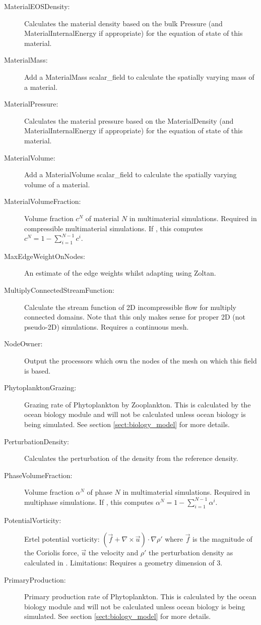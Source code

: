 \begin{description}
\item[MaterialEOSDensity:]Calculates the material density based on the bulk Pressure (and MaterialInternalEnergy if appropriate) for the equation of state of this material.
\item[MaterialMass:]Add a MaterialMass scalar\_field to calculate the spatially varying mass of a material. 
\item[MaterialPressure:] Calculates the material pressure based on the MaterialDensity (and MaterialInternalEnergy if appropriate) for the equation of state of this material.
\item[MaterialVolume:]Add a MaterialVolume scalar\_field to calculate the spatially varying volume of a material.
\item[MaterialVolumeFraction:]Volume fraction $c^N$ of material $N$ in multimaterial simulations. Required in compressible multimaterial simulations. If , this computes $c^N = 1 - \sum_{i=1}^{N-1}c^i$.
\item[MaxEdgeWeightOnNodes:]An estimate of the edge weights whilst adapting using Zoltan.
\item[MultiplyConnectedStreamFunction:]Calculate the stream function of 2D incompressible flow for multiply connected domains. Note that this only makes sense for proper 2D (not pseudo-2D) simulations. Requires a continuous mesh.
\item[NodeOwner:]Output the processors which own the nodes of the mesh on which this field is based.   
\item[PhytoplanktonGrazing:]Grazing rate of Phytoplankton by Zooplankton. This is calculated by the ocean biology module and will not be calculated unless ocean biology is being simulated. See section \ref{sect:biology_model} for more details.
\item[PerturbationDensity:]Calculates the perturbation of the density from the reference density.
\item[PhaseVolumeFraction:]Volume fraction $\alpha^N$ of phase $N$ in multimaterial simulations. Required in multiphase simulations. If , this computes $\alpha^N = 1 - \sum_{i=1}^{N-1}\alpha^i$.
\item[PotentialVorticity:]Ertel potential vorticity: $(\vec{f} + \nabla \times \vec{u}) \cdot \nabla \rho'$ where $\vec{f}$ is the magnitude of the Coriolis force, $\vec{u}$ the velocity and $\rho '$ the perturbation density as calculated in .
	Limitations: Requires a geometry dimension of 3. 
\item[PrimaryProduction:]Primary production rate of Phytoplankton. This is calculated by the ocean biology module and will not be calculated unless ocean biology is being simulated.  See section \ref{sect:biology_model} for more details.

\end{description}
